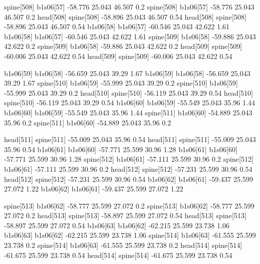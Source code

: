 spine[508]    b1s06[57]    -58.776    25.043    46.507    0.2
spine[508]    b1s06[57]    -58.776    25.043    46.507    0.2
head[508]    spine[508]    -58.896    25.043    46.507    0.54
head[508]    spine[508]    -58.896    25.043    46.507    0.54
b1s06[58]    b1s06[57]    -60.546    25.043    42.622    1.61
b1s06[58]    b1s06[57]    -60.546    25.043    42.622    1.61
spine[509]    b1s06[58]    -59.886    25.043    42.622    0.2
spine[509]    b1s06[58]    -59.886    25.043    42.622    0.2
head[509]    spine[509]    -60.006    25.043    42.622    0.54
head[509]    spine[509]    -60.006    25.043    42.622    0.54


b1s06[59]    b1s06[58]    -56.659    25.043    39.29    1.67
b1s06[59]    b1s06[58]    -56.659    25.043    39.29    1.67
spine[510]    b1s06[59]    -55.999    25.043    39.29    0.2
spine[510]    b1s06[59]    -55.999    25.043    39.29    0.2
head[510]    spine[510]    -56.119    25.043    39.29    0.54
head[510]    spine[510]    -56.119    25.043    39.29    0.54
b1s06[60]    b1s06[59]    -55.549    25.043    35.96    1.44
b1s06[60]    b1s06[59]    -55.549    25.043    35.96    1.44
spine[511]    b1s06[60]    -54.889    25.043    35.96    0.2
spine[511]    b1s06[60]    -54.889    25.043    35.96    0.2


head[511]    spine[511]    -55.009    25.043    35.96    0.54
head[511]    spine[511]    -55.009    25.043    35.96    0.54
b1s06[61]    b1s06[60]    -57.771    25.599    30.96    1.28
b1s06[61]    b1s06[60]    -57.771    25.599    30.96    1.28
spine[512]    b1s06[61]    -57.111    25.599    30.96    0.2
spine[512]    b1s06[61]    -57.111    25.599    30.96    0.2
head[512]    spine[512]    -57.231    25.599    30.96    0.54
head[512]    spine[512]    -57.231    25.599    30.96    0.54
b1s06[62]    b1s06[61]    -59.437    25.599    27.072    1.22
b1s06[62]    b1s06[61]    -59.437    25.599    27.072    1.22


spine[513]    b1s06[62]    -58.777    25.599    27.072    0.2
spine[513]    b1s06[62]    -58.777    25.599    27.072    0.2
head[513]    spine[513]    -58.897    25.599    27.072    0.54
head[513]    spine[513]    -58.897    25.599    27.072    0.54
b1s06[63]    b1s06[62]    -62.215    25.599    23.738    1.06
b1s06[63]    b1s06[62]    -62.215    25.599    23.738    1.06
spine[514]    b1s06[63]    -61.555    25.599    23.738    0.2
spine[514]    b1s06[63]    -61.555    25.599    23.738    0.2
head[514]    spine[514]    -61.675    25.599    23.738    0.54
head[514]    spine[514]    -61.675    25.599    23.738    0.54


